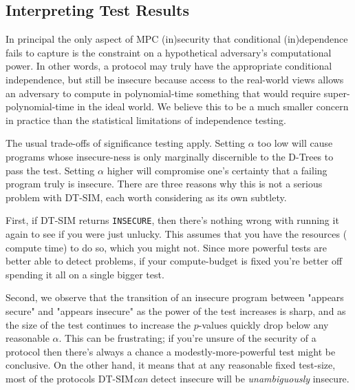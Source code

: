 \documentclass[compsoc, conference, a4paper, 10pt, times]{IEEEtran}
\newcommand{\toolname}{\textsc{DT-SIM}\xspace}
\begin{document}
\subsection{Interpreting Test Results}

In principal the only aspect of MPC (in)security that conditional (in)dependence fails to capture
is the constraint on a hypothetical adversary's computational power.
In other words, a protocol may truly have the appropriate conditional independence,
but still be insecure because access to the real-world views allows an adversary to compute in polynomial-time
something that would require super-polynomial-time in the ideal world.
We believe this to be a much smaller concern in practice than the statistical limitations of independence testing.

The usual trade-offs of significance testing apply.
Setting $\alpha$ too low will cause programs whose insecure-ness is only marginally discernible to the D-Trees
to pass the test.
Setting $\alpha$ higher will compromise one's certainty that a failing program truly is insecure.
There are three reasons why this is not a serious problem with \toolname, each worth considering as its own subtlety.

First, if \toolname returns \texttt{INSECURE},
then there's nothing wrong with running it again to see if you were just unlucky.
This assumes that you have the resources (\eg{} compute time) to do so, which you might not.
Since more powerful tests are better able to detect problems,
if your compute-budget is fixed you're better off spending it all on a single bigger test.

Second, we observe that the transition of an insecure program between "appears secure" and "appears insecure"
as the power of the test increases is sharp,
and as the size of the test continues to increase the $p$-values quickly drop below any reasonable $\alpha$.
This can be frustrating; if you're unsure of the security of a protocol
then there's always a chance a modestly-more-powerful test might be conclusive.
On the other hand, it means that at any reasonable fixed test-size,
most of the protocols \toolname \textit{can} detect insecure will be \textit{unambiguously} insecure.
\end{document}
